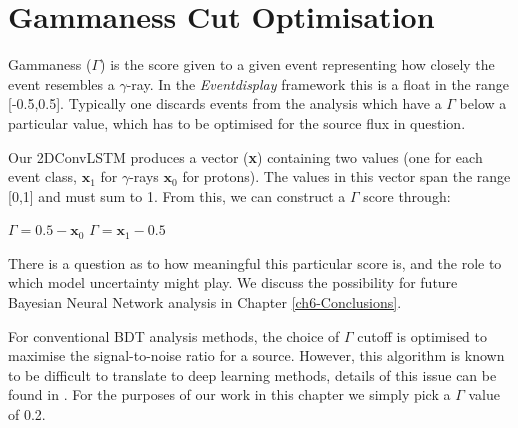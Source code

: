\section{Gammaness Cut Optimisation}
Gammaness ($\Gamma$) is the score given to a given event representing how closely the event resembles a $\gamma$-ray. In the \textit{Eventdisplay} framework this is a float in the range [-0.5,0.5]. Typically one discards events from the analysis which have a $\Gamma$ below a particular value, which has to be optimised for the source flux in question. 

Our 2DConvLSTM produces a vector (\textbf{x}) containing two values (one for each event class,   $\textbf{x}_1$ for $\gamma$-rays $\textbf{x}_0$ for protons). The values in this vector span the range [0,1] and must sum to 1. From this, we can construct a $\Gamma$ score through:

\begin{algorithmic}
    \STATE $\Gamma=0.5-\textbf{x}_0$
    \ELSE
    \STATE $\Gamma=\textbf{x}_1-0.5$
    \ENDIF
\end{algorithmic}
There is a question as to how meaningful this particular score is, and the role to which model uncertainty might play. We discuss the possibility for future Bayesian Neural Network analysis in Chapter \ref{ch6-Conclusions}.

For conventional BDT analysis methods, the choice of $\Gamma$ cutoff is optimised to maximise the signal-to-noise ratio for a source. However, this algorithm is known to be difficult to translate to deep learning methods, details of this issue can be found in \cite{Shilon}. For the purposes of our work in this chapter we simply pick a $\Gamma$ value of 0.2.

